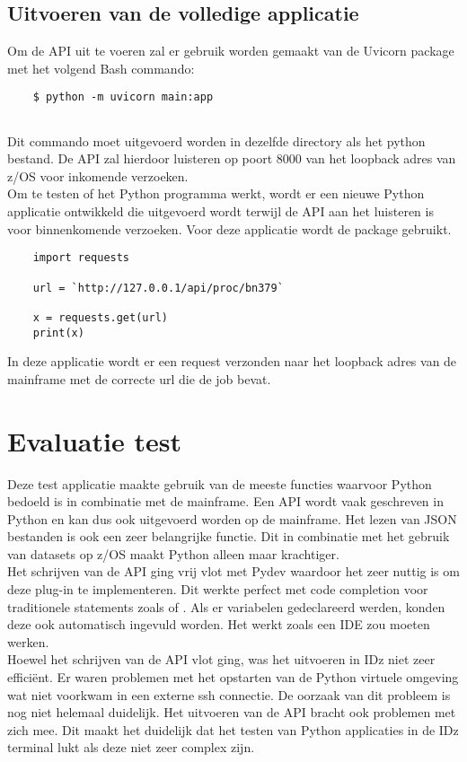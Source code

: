 \section{Uitvoeren van de volledige applicatie}
Om de API uit te voeren zal er gebruik worden gemaakt van de Uvicorn package met het volgend Bash commando:

\begin{lstlisting}
    $ python -m uvicorn main:app
    
\end{lstlisting}
Dit commando moet uitgevoerd worden in dezelfde directory als het python bestand. De API zal hierdoor luisteren op poort 8000 van het loopback adres van z/OS voor inkomende verzoeken. \\

Om te testen of het Python programma werkt, wordt er een nieuwe Python applicatie ontwikkeld die uitgevoerd wordt terwijl de API aan het luisteren is voor binnenkomende verzoeken. Voor deze applicatie wordt de  package gebruikt. 

\begin{lstlisting}
    import requests
    
    url = `http://127.0.0.1/api/proc/bn379`
    
    x = requests.get(url)
    print(x)
\end{lstlisting}

In deze applicatie wordt er een request verzonden naar het loopback adres van de mainframe met de correcte url die de job  bevat. 

\chapter{Evaluatie test}
\label{ch:eval-test}
Deze test applicatie maakte gebruik van de meeste functies waarvoor Python bedoeld is in combinatie met de mainframe. Een API wordt vaak geschreven in Python en kan dus ook uitgevoerd worden op de mainframe. Het lezen van JSON bestanden is ook een zeer belangrijke functie. Dit in combinatie met het gebruik van datasets op z/OS maakt Python alleen maar krachtiger. \\

Het schrijven van de API ging vrij vlot met Pydev waardoor het zeer nuttig is om deze plug-in te implementeren. Dit werkte perfect met code completion voor traditionele statements zoals  of . Als er variabelen gedeclareerd werden, konden deze ook automatisch ingevuld worden. Het werkt zoals een IDE zou moeten werken. \\

Hoewel het schrijven van de API vlot ging, was het uitvoeren in IDz niet zeer efficiënt. Er waren problemen met het opstarten van de Python virtuele omgeving wat niet voorkwam in een externe ssh connectie. De oorzaak van dit probleem is nog niet helemaal duidelijk. Het uitvoeren van de API bracht ook problemen met zich mee. Dit maakt het duidelijk dat het testen van Python applicaties in de IDz terminal lukt als deze niet zeer complex zijn.







